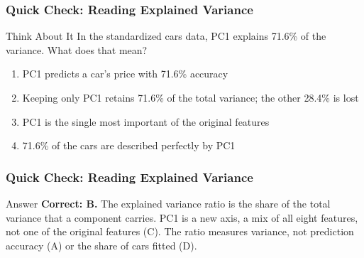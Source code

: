 \begin{frame}[fragile]\frametitle{Quick Check: Reading Explained Variance}
\begin{block}{Think About It}
In the standardized cars data, PC1 explains 71.6\% of the variance. What does that mean?
\begin{enumerate}
  \item[A.] PC1 predicts a car's price with 71.6\% accuracy
  \item[B.] Keeping only PC1 retains 71.6\% of the total variance; the other 28.4\% is lost
  \item[C.] PC1 is the single most important of the original features
  \item[D.] 71.6\% of the cars are described perfectly by PC1
\end{enumerate}
\end{block}
\end{frame}

\begin{frame}[fragile]\frametitle{Quick Check: Reading Explained Variance}
\begin{block}{Answer}
\textbf{Correct: B.} The explained variance ratio is the share of the total variance that a component carries. PC1 is a new axis, a mix of all eight features, not one of the original features (C). The ratio measures variance, not prediction accuracy (A) or the share of cars fitted (D).
\end{block}
\end{frame}
